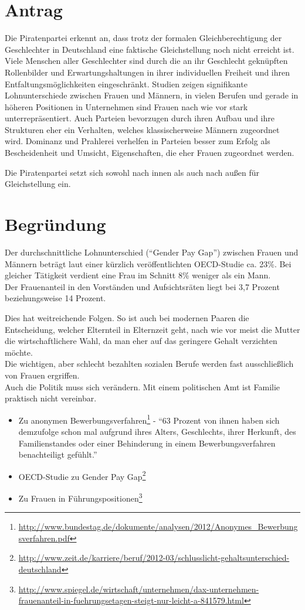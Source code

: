 \section{Antrag}

Die Piratenpartei erkennt an, dass trotz der formalen Gleichberechtigung der Geschlechter in Deutschland eine faktische Gleichstellung noch nicht erreicht ist. Viele Menschen aller Geschlechter sind durch die an ihr Geschlecht geknüpften Rollenbilder und Erwartungshaltungen in ihrer individuellen Freiheit und ihren Entfaltungsmöglichkeiten eingeschränkt. Studien zeigen signifikante Lohnunterschiede zwischen Frauen und Männern, in vielen Berufen und gerade in höheren Positionen in Unternehmen sind Frauen nach wie vor stark unterrepräsentiert. Auch Parteien bevorzugen durch ihren Aufbau und ihre Strukturen eher ein Verhalten, welches klassischerweise Männern zugeordnet wird. Dominanz und Prahlerei verhelfen in Parteien besser zum Erfolg als Bescheidenheit und Umsicht, Eigenschaften, die eher Frauen zugeordnet werden.

Die Piratenpartei setzt sich sowohl nach innen als auch nach außen für Gleichstellung ein.

\section{Begründung}

Der durchschnittliche Lohnunterschied (``Gender Pay Gap'') zwischen Frauen und Männern beträgt laut einer kürzlich veröffentlichten OECD-Studie ca. 23\%. Bei gleicher Tätigkeit verdient eine Frau im Schnitt 8\% weniger als ein Mann. \\Der Frauenanteil in den Vorständen und Aufsichtsräten liegt bei 3,7 Prozent beziehungsweise 14 Prozent.

Dies hat weitreichende Folgen. So ist auch bei modernen Paaren die Entscheidung, welcher Elternteil in Elternzeit geht, nach wie vor meist die Mutter die wirtschaftlichere Wahl, da man eher auf das geringere Gehalt verzichten möchte.\\Die wichtigen, aber schlecht bezahlten sozialen Berufe werden fast ausschließlich von Frauen ergriffen. \\Auch die Politik muss sich verändern. Mit einem politischen Amt ist Familie praktisch nicht vereinbar.

\begin{itemize}
\item
  Zu anonymen Bewerbungsverfahren\footnote{\url{http://www.bundestag.de/dokumente/analysen/2012/Anonymes\_Bewerbungsverfahren.pdf}} - ``63 Prozent von ihnen haben sich demzufolge schon mal aufgrund ihres Alters, Geschlechts, ihrer Herkunft, des Familienstandes oder einer Behinderung in einem Bewerbungsverfahren benachteiligt gefühlt.''
\item
  OECD-Studie zu Gender Pay Gap\footnote{\url{http://www.zeit.de/karriere/beruf/2012-03/schlusslicht-gehaltsunterschied-deutschland}}
\item
  Zu Frauen in Führungspositionen\footnote{\url{http://www.spiegel.de/wirtschaft/unternehmen/dax-unternehmen-frauenanteil-in-fuehrungsetagen-steigt-nur-leicht-a-841579.html}}
\end{itemize}
